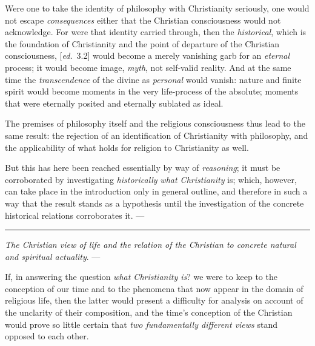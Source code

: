 \documentclass[12pt,a4paper,openany]{book}
\newcommand{\kpage}[1]{\marginnote{\footnotesize\textit{[#1]}}}
\newcommand{\ed}[1]{{\small[\textit{ed.}\ #1]}}
\newcommand{\lecture}[1]{\par\bigskip\noindent{\large #1}\par\nobreak\medskip}
\newcommand{\sepline}{\par\begin{center}\rule{2cm}{0.4pt}\end{center}\par}
\begin{document}
Were one to take the identity of philosophy with Christianity seriously,
one would not escape \emph{consequences} either that the Christian
consciousness would not acknowledge. For were
that identity carried through, then the \emph{historical}, which is the
foundation of Christianity and the point of departure of the Christian consciousness, \ed{3.2} would become
a merely vanishing garb for an \emph{eternal} process; it would become
image, \emph{myth}, not self-valid reality. And at the same time the \emph{transcendence}
of the divine as \emph{personal} would vanish: nature and
finite spirit would become moments in the very life-process of the absolute;
moments that were eternally posited and eternally sublated as ideal.

The premises of philosophy itself and the religious consciousness thus
lead to the same result: the rejection of an identification of
Christianity with philosophy, and the applicability of what holds
for religion to Christianity as well.

But this has here been reached essentially by way of \emph{reasoning}; it must
be corroborated by investigating \emph{historically} \emph{what Christianity} is; which,
however, can take place in the introduction only in general outline,
and therefore in such a way that the result stands as a hypothesis
until the investigation of the concrete historical relations corroborates
it. ---

\sepline

\lecture{\kpage{83}\ed{3.3} Lecture 3}

\emph{The Christian view of life and the relation of the Christian to concrete natural}
\emph{and spiritual actuality}. ---

If, in answering the question \emph{what Christianity is}?
we were to keep to the conception of our time and to the phenomena that now
appear in the domain of religious life, then the latter would present
a difficulty for analysis on account of the unclarity of their
composition, and the time's conception of the Christian would
prove so little certain that \emph{two fundamentally different views} stand opposed to
each other.
\end{document}
